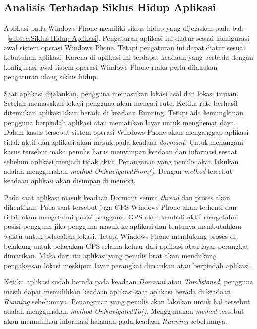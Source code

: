 \subsection{Analisis Terhadap Siklus Hidup Aplikasi}
\label{lab:Analisis Terhadap Siklus Hidup Aplikasi}
\hspace{0.5cm} Aplikasi pada Windows Phone memiliki siklus hidup yang dijelaskan pada bab ~\ref{subsec:Siklus Hidup Aplikasi}. Pengaturan aplikasi ini diatur sesuai konfigurasi awal sistem operasi Windows Phone. Tetapi pengaturan ini dapat diatur sesuai kebutuhan aplikasi. Karena di aplikasi ini terdapat keadaan yang berbeda dengan konfigurasi awal sistem operasi Windows Phone maka perlu dilakukan pengaturan ulang siklus hidup.

Saat aplikasi dijalankan, pengguna memasukan lokasi asal dan lokasi tujuan. Setelah memasukan lokasi pengguna akan mencari rute. Ketika rute berhasil ditemukan aplikasi akan berada di keadaan Running. Tetapi ada kemungkinan pengguna berpindah aplikasi atau mematikan layar untuk menghemat daya. Dalam kasus tersebut sistem operasi Windows Phone akan menganggap aplikasi tidak aktif dan aplikasi akan masuk pada keadaan \textit{dormant}. Untuk menangani kasus tersebut maka penulis harus menyimpan keadaan dan informasi sesaat sebelum aplikasi menjadi tidak aktif. Penanganan yang penulis akan lakukan adalah menggunakan \textit{method} \textit{OnNavigatedFrom()}. Dengan \textit{method} tersebut keadaan aplikasi akan disimpan di memori.

Pada saat aplikasi masuk keadaan Dormant semua \textit{thread} dan proses akan dihentikan. Pada saat tersebut juga GPS Windows Phone akan terhenti dan tidak akan mengetahui posisi pengguna. GPS akan kembali aktif mengetahui posisi pengguna jika pengguna masuk ke aplikasi dan tentunya membutuhkan waktu untuk pelacakan lokasi. Tetapi Windows Phone mendukung proses di belakang untuk pelacakan GPS selama keluar dari aplikasi atau layar perangkat dimatikan. Maka dari itu aplikasi yang penulis buat akan mendukung pengaksesan lokasi meskipun layar perangkat dimatikan atau berpindah aplikasi. 

Ketika aplikasi sudah berada pada keadaan \textit{Dormant} atau \textit{Tombstoned}, pengguna masih dapat memulihkan keadaan aplikasi saat aplikasi berada di keadaan \textit{Running} sebelumnya. Penanganan yang penulis akan lakukan untuk hal tersebut adalah menggunakan \textit{method} \textit{OnNavigatedTo()}. Menggunakan \textit{method} tersebut akan memulihkan informasi halaman pada keadaan \textit{Running} sebelumnya.

